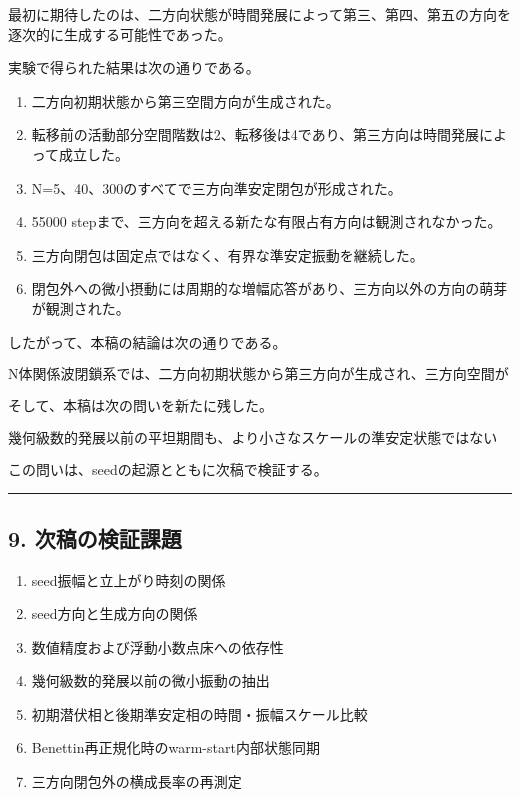 \documentclass[
  a4paper,
]{ltjsarticle}
\providecommand{\tightlist}{%
  \setlength{\itemsep}{0pt}\setlength{\parskip}{0pt}}
\begin{document}
最初に期待したのは、二方向状態が時間発展によって第三、第四、第五の方向を逐次的に生成する可能性であった。

実験で得られた結果は次の通りである。

\begin{enumerate}
\def\labelenumi{\arabic{enumi}.}
\tightlist
\item
  二方向初期状態から第三空間方向が生成された。
\item
  転移前の活動部分空間階数は2、転移後は4であり、第三方向は時間発展によって成立した。
\item
  N=5、40、300のすべてで三方向準安定閉包が形成された。
\item
  55000 stepまで、三方向を超える新たな有限占有方向は観測されなかった。
\item
  三方向閉包は固定点ではなく、有界な準安定振動を継続した。
\item
  閉包外への微小摂動には周期的な増幅応答があり、三方向以外の方向の萌芽が観測された。
\end{enumerate}

したがって、本稿の結論は次の通りである。

\[
\boxed{
\text{N体関係波閉鎖系では、二方向初期状態から第三方向が生成され、三方向空間が動的準安定閉包として成立する。}
}
\]

そして、本稿は次の問いを新たに残した。

\[
\boxed{
\text{幾何級数的発展以前の平坦期間も、より小さなスケールの準安定状態ではないか。}
}
\]

この問いは、seedの起源とともに次稿で検証する。

\begin{center}\rule{0.5\linewidth}{0.5pt}\end{center}

\subsection{9.
次稿の検証課題}\label{ux6b21ux7a3fux306eux691cux8a3cux8ab2ux984c}

\begin{enumerate}
\def\labelenumi{\arabic{enumi}.}
\tightlist
\item
  seed振幅と立上がり時刻の関係
\item
  seed方向と生成方向の関係
\item
  数値精度および浮動小数点床への依存性
\item
  幾何級数的発展以前の微小振動の抽出
\item
  初期潜伏相と後期準安定相の時間・振幅スケール比較
\item
  Benettin再正規化時のwarm-start内部状態同期
\item
  三方向閉包外の横成長率の再測定
\end{enumerate}
\end{document}
